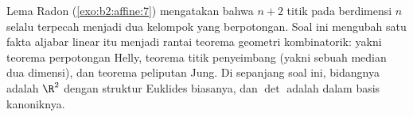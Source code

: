 \begin{problem}\label{pb:b2:affine:1}
Lema Radon (\cref{exo:b2:affine:7}) mengatakan bahwa $n + 2$
titik pada  berdimensi $n$ selalu terpecah menjadi
dua kelompok yang  berpotongan. Soal ini mengubah
satu fakta aljabar linear itu menjadi rantai teorema geometri
kombinatorik: yakni teorema perpotongan Helly, teorema
titik penyeimbang (yakni sebuah median dua dimensi), dan teorema
peliputan Jung. Di sepanjang soal ini, bidangnya adalah $\R^2$ dengan
struktur Euklides biasanya, dan $\det$ adalah  dalam
basis kanoniknya.


\end{problem}
